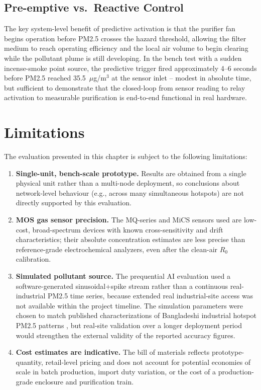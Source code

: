 \subsection{Pre-emptive vs.\ Reactive Control}
The key system-level benefit of predictive activation is that the purifier fan begins operation before PM2.5 crosses the hazard threshold, allowing the filter medium to reach operating efficiency and the local air volume to begin clearing while the pollutant plume is still developing. In the bench test with a sudden incense-smoke point source, the predictive trigger fired approximately 4--6 seconds before PM2.5 reached 35.5~$\mu$g/m$^3$ at the sensor inlet -- modest in absolute time, but sufficient to demonstrate that the closed-loop from sensor reading to relay activation to measurable purification is end-to-end functional in real hardware.

\section{Limitations}
\label{sec:exp-limitations}

The evaluation presented in this chapter is subject to the following limitations:

\begin{enumerate}
    \item \textbf{Single-unit, bench-scale prototype.} Results are obtained from a single physical unit rather than a multi-node deployment, so conclusions about network-level behaviour (e.g., across many simultaneous hotspots) are not directly supported by this evaluation.
    \item \textbf{MOS gas sensor precision.} The MQ-series and MiCS sensors used are low-cost, broad-spectrum devices with known cross-sensitivity and drift characteristics; their absolute concentration estimates are less precise than reference-grade electrochemical analyzers, even after the clean-air $R_0$ calibration.
    \item \textbf{Simulated pollutant source.} The prequential AI evaluation used a software-generated sinusoidal+spike stream rather than a continuous real-industrial PM2.5 time series, because extended real industrial-site access was not available within the project timeline. The simulation parameters were chosen to match published characterizations of Bangladeshi industrial hotspot PM2.5 patterns \citep{basak2025spatial,ali2025longterm}, but real-site validation over a longer deployment period would strengthen the external validity of the reported accuracy figures.
    \item \textbf{Cost estimates are indicative.} The bill of materials reflects prototype-quantity, retail-level pricing and does not account for potential economies of scale in batch production, import duty variation, or the cost of a production-grade enclosure and purification train.
\end{enumerate}

